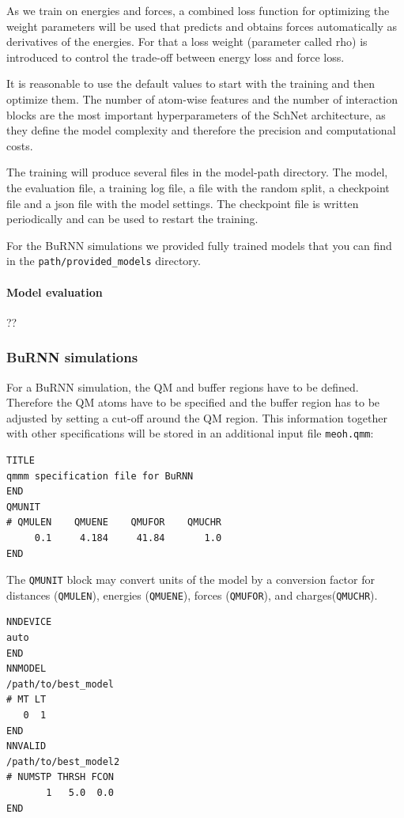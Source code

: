 As we train on energies and forces, a combined loss function for optimizing the weight parameters will be used that predicts and obtains forces automatically as derivatives of the energies. For that a loss weight (parameter called rho) is introduced to control the trade-off between energy loss and force loss.

It is reasonable to use the default values to start with the training and then optimize them. The number of atom-wise features and the number of interaction blocks are the most important hyperparameters of the SchNet architecture, as they define the model complexity and therefore the precision and computational costs. 

The training will produce several files in the model-path directory. The model, the evaluation file, a training log file, a file with the random split, a checkpoint file and a json file with the model settings. The checkpoint file is written periodically and can be used to restart the training.   

For the BuRNN simulations we provided fully trained models that you can find in the 
\texttt{path/provided\_models} directory.

\paragraph{Model evaluation}
??


\subsubsection{BuRNN simulations}
For a BuRNN simulation, the QM and buffer regions have to be defined. Therefore the QM atoms have to be specified and the buffer region has to be adjusted by setting a cut-off around the QM region. This information together with other specifications will be stored in an additional input file \texttt{meoh.qmm}:

\begin{lstlisting}[breaklines=true, breakatwhitespace=false]
TITLE
qmmm specification file for BuRNN  
END
QMUNIT
# QMULEN    QMUENE    QMUFOR    QMUCHR
     0.1     4.184     41.84       1.0
END
\end{lstlisting}

The \texttt{QMUNIT} block may convert units of the model by a conversion factor for distances (\texttt{QMULEN}), energies (\texttt{QMUENE}), forces (\texttt{QMUFOR}), and charges(\texttt{QMUCHR}).

\begin{lstlisting}[breaklines=true, breakatwhitespace=false]
NNDEVICE
auto
END
NNMODEL
/path/to/best_model
# MT LT
   0  1
END
NNVALID
/path/to/best_model2
# NUMSTP THRSH FCON 
       1   5.0  0.0
END
\end{lstlisting}

